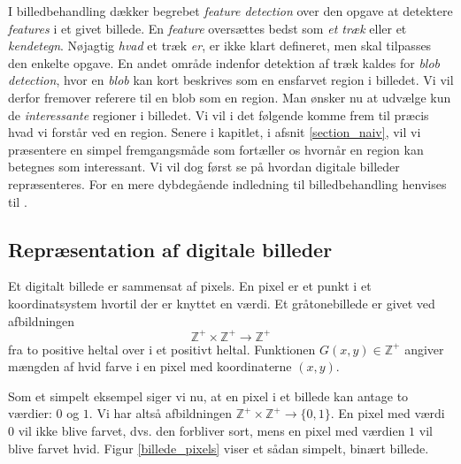 {
{\sffamily I billedbehandling dækker begrebet \emph{feature detection}
over den opgave at detektere \emph{features} i et givet billede. En
\emph{feature} oversættes bedst som \emph{et træk} eller et
\emph{kendetegn}. Nøjagtig \emph{hvad} et træk \emph{er}, er ikke klart
defineret, men skal tilpasses den enkelte
opgave\cite{WikiFeatureDetection}\cite{SIOlsen}. En andet område
indenfor detektion af træk kaldes for \emph{blob detection}, hvor en
\emph{blob} kan kort beskrives som en ensfarvet region i billedet. Vi
vil derfor fremover referere til en blob som en region. Man ønsker nu at
udvælge kun de \emph{interessante} regioner i billedet. Vi vil i det
følgende komme frem til præcis hvad vi forstår ved en region. Senere i
kapitlet, i afsnit \ref{section_naiv}, vil vi præsentere en simpel
fremgangsmåde som fortæller os hvornår en region kan betegnes som
interessant. Vi vil dog først se på hvordan digitale billeder
repræsenteres. For en mere dybdegående indledning til billedbehandling
henvises til \cite{SIOlsen}.
}

\subsection{Repræsentation af digitale billeder}
Et digitalt billede er sammensat af pixels. En pixel er et punkt i et
koordinatsystem hvortil der er knyttet en værdi. Et gråtonebillede er
givet ved afbildningen
\begin{equation}
    \mathbb{Z}^{+}\times{} \mathbb{Z}^{+} \rightarrow \mathbb{Z}^{+}
\end{equation}
fra to positive heltal over i et positivt heltal.  Funktionen $G(x, y)
\in \mathbb{Z}^{+}$ angiver mængden af hvid farve i en pixel med
koordinaterne $(x, y)$.

Som et simpelt eksempel siger vi nu, at en pixel i et billede kan antage
to værdier: $0$ og $1$. Vi har altså afbildningen $\mathbb{Z}^{+}\times{}
\mathbb{Z}^{+} \rightarrow \{0, 1\}$. En pixel med værdi $0$ vil ikke
blive farvet, dvs. den forbliver sort, mens en pixel med værdien $1$ vil
blive farvet hvid.  Figur \ref{billede_pixels} viser et sådan simpelt,
binært billede.

}
